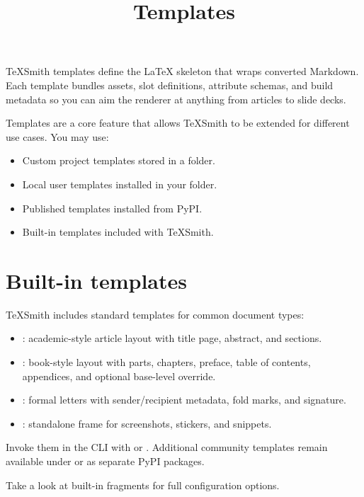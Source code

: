\documentclass[a4paper,twoside]{article}
\title{Templates}
\author{}\date{}
\begin{document}
\maketitle
TeXSmith templates define the \LaTeX{} skeleton that wraps converted Markdown. Each
template bundles assets, slot definitions, attribute schemas, and build metadata
so you can aim the renderer at anything from articles to slide decks.

Templates are a core feature that allows TeXSmith to be extended for different
use cases. You may use:
\begin{itemize}
\item Custom project templates stored in a  folder.
\item Local user templates installed in your  folder.
\item Published templates installed from PyPI.
\item Built-in templates included with TeXSmith.
\end{itemize}
\section{Built-in templates}
TeXSmith includes standard templates for common document types:
\begin{itemize}
\item {}: academic-style article layout with title page, abstract, and sections.
\item {}: book-style layout with parts, chapters, preface, table of contents, appendices, and optional  base-level override.
\item {}: formal letters with sender/recipient metadata, fold marks, and signature.
\item {}: standalone  frame for screenshots, stickers, and snippets.
\end{itemize}
Invoke them in the CLI with  or . Additional community templates remain available under  or as separate PyPI packages.

Take a look at built-in fragments for full configuration options.
\end{document}
